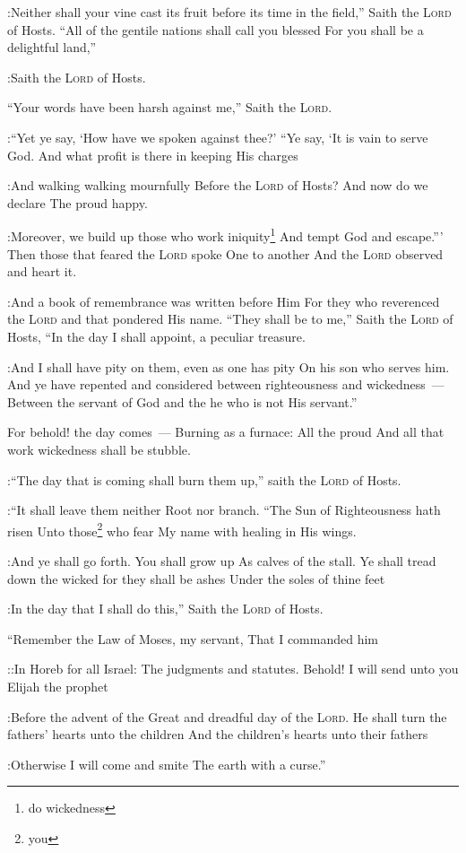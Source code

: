 \begin{inparaenum}
:Neither shall your vine cast its fruit before its time in the field,'' Saith the \textsc{Lord} of Hosts.%
     ``All of the gentile nations shall call you blessed For you shall be a delightful land,''%

:Saith the \textsc{Lord} of Hosts.%
    
     ``Your words have been harsh against me,'' Saith the \textsc{Lord}.%

:``Yet ye say, `How have we spoken against thee?'%
     ``Ye say, `It is vain to serve God. And what profit is there in keeping His charges%

:And walking walking mournfully Before the \textsc{Lord} of Hosts?%
     And now do we declare The proud happy.%

:Moreover, we build up those who work iniquity\footnote{do wickedness} And tempt God and escape.'''%
     Then those that feared the \textsc{Lord} spoke One to another And the \textsc{Lord} observed and heart it.%

:And a book of remembrance was written before Him For they who reverenced the \textsc{Lord} and that pondered His name.%
     ``They shall be to me,'' Saith the \textsc{Lord} of Hosts, ``In the day I shall appoint, a peculiar treasure.%

:And I shall have pity on them, even as one has pity On his son who serves him.%
     And ye have repented and considered between righteousness and wickedness~--- Between the servant of God and the he who is not His servant.''%
    
     For behold! the day comes~--- Burning as a furnace: All the proud And all that work wickedness shall be stubble.%

:``The day that is coming shall burn them up,'' saith the \textsc{Lord} of Hosts.

:``It shall leave them neither Root nor branch.%
     ``The Sun of Righteousness hath risen Unto those\footnote{you} who fear My name with healing in His wings.%

:And ye shall go forth. You shall grow up As calves of the stall.%
     Ye shall tread down the wicked for they shall be ashes Under the soles of thine feet%

:In the day that I shall do this,'' Saith the \textsc{Lord} of Hosts.%
    
     ``Remember the Law of Moses, my servant, That I commanded him%

::In Horeb for all Israel: The judgments and statutes.%
     Behold! I will send unto you Elijah the prophet%

:Before the advent of the Great and dreadful day of the \textsc{Lord}.%
     He shall turn the fathers' hearts unto the children And the children's hearts unto their fathers%

:Otherwise I will come and smite The earth with a curse.''%
\end{inparaenum}
